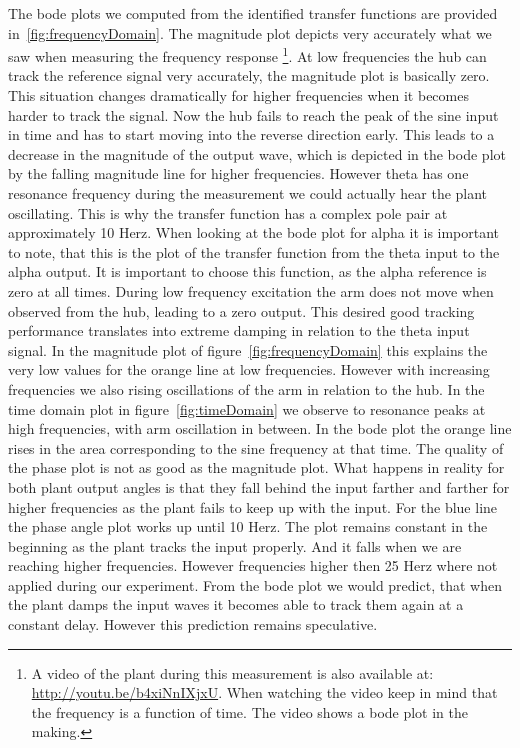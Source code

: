 \documentclass[ twoside,openright,titlepage,numbers=noenddot,headinclude,%
                footinclude=true,cleardoublepage=empty,abstractoff, %
                BCOR=5mm,paper=a4,fontsize=11pt,%
                ngerman,american,%
                ]{scrreprt}
\begin{document}
The bode plots we computed from the identified transfer functions are provided in~\ref{fig:frequencyDomain}. The magnitude plot depicts very accurately what we saw when measuring the frequency response \footnote{A video of the plant during this measurement is also available at: \url{http://youtu.be/b4xiNnIXjxU}. When watching the video keep in mind that the frequency is a function of time. The video shows a bode plot in the making.}. At low frequencies the hub can track the reference signal very accurately, the magnitude plot is basically zero. This situation changes dramatically for higher frequencies when it becomes harder to track the signal. Now the hub fails to reach the peak of the sine input in time and has to start moving into the reverse direction early. This leads to a decrease in the magnitude of the output wave, which is depicted in the bode plot by the falling magnitude line for  higher frequencies. However theta has one resonance frequency during the measurement we could actually hear the plant oscillating. This is why the transfer function has a complex pole pair at approximately 10 Herz. 
When looking at the bode plot for alpha it is important to note, that this is the plot of the transfer function from the theta input to the alpha output. It is important to choose this function, as the alpha reference is zero at all times. During low frequency excitation the arm does not move when observed from the hub, leading to a zero output. This desired good tracking performance translates into extreme damping in relation to the theta input signal. In the magnitude plot of figure~\ref{fig:frequencyDomain} this explains the very low values for the orange line at low frequencies. However with increasing frequencies we also rising oscillations of the arm in relation to the hub. In the time domain plot in figure~\ref{fig:timeDomain} we observe to resonance peaks at high frequencies, with arm oscillation in between. In the bode plot the orange line rises in the area corresponding to the sine frequency at that time. 
The quality of the phase plot is not as good as the magnitude plot. What happens in reality for both plant output angles is that they fall behind the input farther and farther for higher frequencies as the plant fails to keep up with the input. For the blue line the phase angle plot works up until 10 Herz. The plot remains constant in the beginning as the plant tracks the input properly. And it falls when we are reaching higher frequencies. However frequencies higher then 25 Herz where not applied during our experiment. From the bode plot we would predict, that when the plant damps the input waves it becomes able to track them again at a constant delay. However this prediction remains speculative.   
\end{document}
